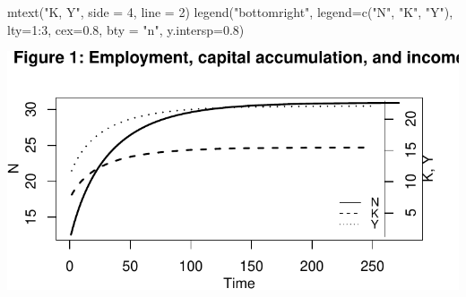 \documentclass[
  letterpaper,
  DIV=11,
  numbers=noendperiod]{scrreprt}
\newenvironment{Shaded}{\begin{snugshade}}{\end{snugshade}}
\newcommand{\AttributeTok}[1]{\textcolor[rgb]{0.40,0.45,0.13}{#1}}
\newcommand{\DecValTok}[1]{\textcolor[rgb]{0.68,0.00,0.00}{#1}}
\newcommand{\FloatTok}[1]{\textcolor[rgb]{0.68,0.00,0.00}{#1}}
\newcommand{\FunctionTok}[1]{\textcolor[rgb]{0.28,0.35,0.67}{#1}}
\newcommand{\NormalTok}[1]{\textcolor[rgb]{0.00,0.23,0.31}{#1}}
\newcommand{\SpecialCharTok}[1]{\textcolor[rgb]{0.37,0.37,0.37}{#1}}
\newcommand{\StringTok}[1]{\textcolor[rgb]{0.13,0.47,0.30}{#1}}
\begin{document}
\begin{Shaded}
\begin{Highlighting}[]
\FunctionTok{mtext}\NormalTok{(}\StringTok{"K, Y"}\NormalTok{, }\AttributeTok{side =} \DecValTok{4}\NormalTok{, }\AttributeTok{line =} \DecValTok{2}\NormalTok{)}
\FunctionTok{legend}\NormalTok{(}\StringTok{"bottomright"}\NormalTok{, }\AttributeTok{legend=}\FunctionTok{c}\NormalTok{(}\StringTok{"N"}\NormalTok{, }\StringTok{"K"}\NormalTok{, }\StringTok{"Y"}\NormalTok{),}
       \AttributeTok{lty=}\DecValTok{1}\SpecialCharTok{:}\DecValTok{3}\NormalTok{, }\AttributeTok{cex=}\FloatTok{0.8}\NormalTok{, }\AttributeTok{bty =} \StringTok{"n"}\NormalTok{, }\AttributeTok{y.intersp=}\FloatTok{0.8}\NormalTok{)}
\end{Highlighting}
\end{Shaded}

\includegraphics{a_ricardian_one_sector_model_files/figure-pdf/ricardo1_2-1.pdf}
\end{document}
